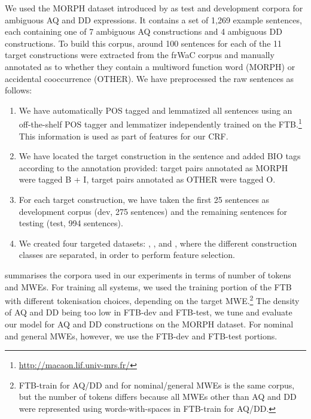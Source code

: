 \documentclass[output=paper,
modfonts
]{langscibook}
\begin{document}
We used the MORPH dataset introduced by \citet{nasr:acl:2015} as test and development corpora for ambiguous AQ and DD expressions. It contains a set of 1,269 example sentences, each containing one of %
7 ambiguous AQ constructions and 4 ambiguous DD constructions. To build this corpus, around 100 sentences for each of the 11 target constructions were extracted from the frWaC corpus and manually annotated as to whether they contain a multiword function word (MORPH) or accidental cooccurrence (OTHER). We have preprocessed the raw sentences as follows:
\begin{enumerate}
 \item We have automatically POS tagged and lemmatized all sentences using an off-the-shelf POS tagger and lemmatizer independently trained on the FTB.\footnote{\url{http://macaon.lif.univ-mrs.fr/}} This information is used as part of features for our CRF.
 \item We have located the target construction in the sentence and added BIO tags according to the annotation provided: target pairs annotated as MORPH were tagged {\textsc B} + {\textsc I}, target pairs annotated as OTHER were tagged {\textsc O}.
 \item For each target construction, we have taken the first 25 sentences as development corpus (dev, 275 sentences) and the remaining sentences for testing (test, 994 sentences).
 \item We created four targeted datasets: \devAQ{}, \devDD{}, \fullAQ{} and \fullDD{}, where the different construction classes are separated, in order to perform feature selection.
\end{enumerate}

 summarises the corpora used in our experiments in terms of number of tokens and MWEs. For training all systems, we used the training portion of the FTB with different tokenisation choices, depending on the target MWE.\footnote{FTB-train for AQ/DD and for nominal/general MWEs is the same corpus, but the number of tokens differs because all MWEs other than AQ and DD were represented using words-with-spaces in FTB-train for AQ/DD.} The density of AQ and DD being too low in FTB-dev and FTB-test, we tune and evaluate our model for AQ and DD constructions on the MORPH dataset. For nominal and general MWEs, however, we use the FTB-dev and FTB-test portions.
\end{document}
